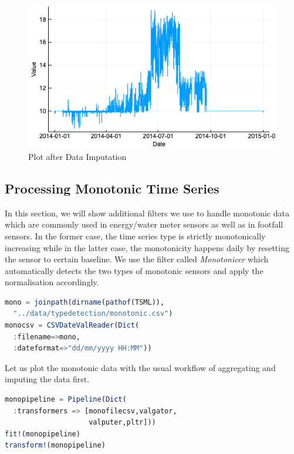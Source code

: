 \documentclass{juliacon}
\begin{document}
\begin{figure}[htbp]
   \centering
   \includegraphics[width=\columnwidth]{amplot.png} %
   \caption{Plot after Data Imputation}
   \label{fig:amplot}
\end{figure}

\subsection{Processing Monotonic Time Series}
In this section, we will show additional filters we use to handle monotonic data which are commonly used in energy/water meter sensors as well as in footfall sensors. In the former case, the time series type is strictly monotonically increasing while in the latter case, the monotonicity happens daily by resetting the sensor to certain baseline. We use the filter called \emph{Monotonicer} which automatically detects the two types of monotonic sensors and apply the normalisation accordingly. 

\begin{lstlisting}[language = Julia]
mono = joinpath(dirname(pathof(TSML)),
  "../data/typedetection/monotonic.csv")
monocsv = CSVDateValReader(Dict(
  :filename=>mono,
  :dateformat=>"dd/mm/yyyy HH:MM"))
\end{lstlisting}

Let us plot the monotonic data with the usual workflow of aggregating and imputing the data first.

\begin{lstlisting}[language = Julia]
monopipeline = Pipeline(Dict(
  :transformers => [monofilecsv,valgator,
                    valputer,pltr]))
fit!(monopipeline)
transform!(monopipeline)
\end{lstlisting}
\end{document}
